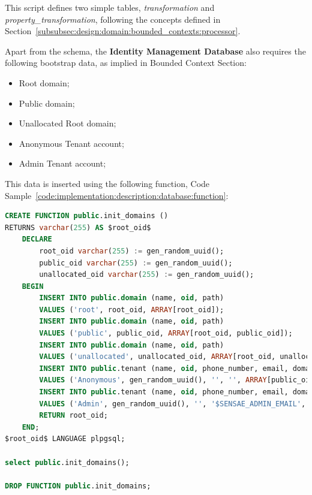 This script defines two simple tables, \textit{transformation} and \textit{property\_transformation}, following the concepts defined in Section~\ref{subsubsec:design:domain:bounded_contexts:processor}.

Apart from the schema, the \textbf{Identity Management Database} also requires the following bootstrap data, as implied in  Bounded Context Section:

\begin{itemize}
    \item Root domain;
    \item Public domain;
    \item Unallocated Root domain;
    \item Anonymous Tenant account;
    \item Admin Tenant account;
\end{itemize}

This data is inserted using the following function, Code Sample~\ref{code:implementation:description:database:function}:

\begin{lstlisting}[language=SQL, caption=Bootstrap function for Identity Management Database, label={code:implementation:description:database:function}]
CREATE FUNCTION public.init_domains () 
RETURNS varchar(255) AS $root_oid$
    DECLARE
        root_oid varchar(255) := gen_random_uuid();
        public_oid varchar(255) := gen_random_uuid();
        unallocated_oid varchar(255) := gen_random_uuid();
    BEGIN
        INSERT INTO public.domain (name, oid, path) 
        VALUES ('root', root_oid, ARRAY[root_oid]);
        INSERT INTO public.domain (name, oid, path) 
        VALUES ('public', public_oid, ARRAY[root_oid, public_oid]);
        INSERT INTO public.domain (name, oid, path) 
        VALUES ('unallocated', unallocated_oid, ARRAY[root_oid, unallocated_oid]);
        INSERT INTO public.tenant (name, oid, phone_number, email, domains) 
        VALUES ('Anonymous', gen_random_uuid(), '', '', ARRAY[public_oid]);
        INSERT INTO public.tenant (name, oid, phone_number, email, domains) 
        VALUES ('Admin', gen_random_uuid(), '', '$SENSAE_ADMIN_EMAIL', ARRAY[root_oid]);
        RETURN root_oid;
    END;
$root_oid$ LANGUAGE plpgsql;

select public.init_domains();

DROP FUNCTION public.init_domains;
\end{lstlisting}

